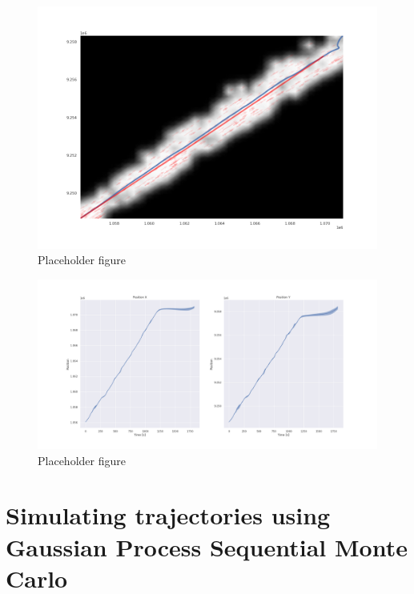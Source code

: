 \begin{figure}
    \centering
    \includegraphics[width=\textwidth]{figures/gp_ekf.png}
    \caption{Placeholder figure}
    \label{fig:my_label}
\end{figure}

\begin{figure}
    \centering
    \includegraphics[width=\textwidth]{figures/gp_ekf_unc.png}
    \caption{Placeholder figure}
    \label{fig:my_label}
\end{figure}


\section{Simulating trajectories using Gaussian Process Sequential Monte Carlo}